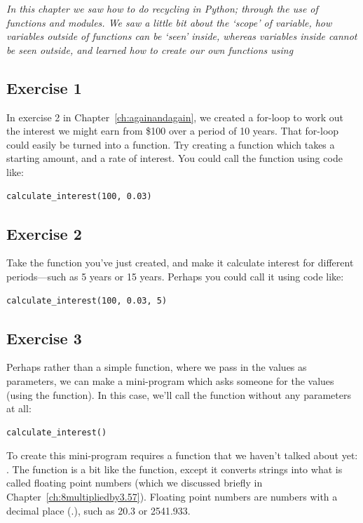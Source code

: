 \emph{In this chapter we saw how to do recycling in Python; through the use of functions and modules.  We saw a little bit about the `scope' of variable, how variables outside of functions can be `seen' inside, whereas variables inside cannot be seen outside, and learned how to create our own functions using }

\subsection*{Exercise 1}
In exercise 2 in Chapter~\ref{ch:againandagain}, we created a for-loop to work out the interest we might earn from \$100 over a period of 10 years.  That for-loop could easily be turned into a function.  Try creating a function which takes a starting amount, and a rate of interest.  You could call the function using code like:

\begin{listing}
\begin{verbatim}
calculate_interest(100, 0.03)
\end{verbatim}
\end{listing}

\subsection*{Exercise 2}
Take the function you've just created, and make it calculate interest for different periods---such as 5 years or 15 years.  Perhaps you could call it using code like:

\begin{listing}
\begin{verbatim}
calculate_interest(100, 0.03, 5)
\end{verbatim}
\end{listing}

\subsection*{Exercise 3}
Perhaps rather than a simple function, where we pass in the values as parameters, we can make a mini-program which asks someone for the values (using the  function).  In this case, we'll call the function without any parameters at all:

\begin{listing}
\begin{verbatim}
calculate_interest()
\end{verbatim}
\end{listing}

\noindent
To create this mini-program requires a function that we haven't talked about yet: . The  function is a bit like the  function, except it converts strings into what is called floating point numbers (which we discussed briefly in Chapter~\ref{ch:8multipliedby3.57}).  Floating point numbers are numbers with a decimal place (.), such as 20.3 or 2541.933.

\newpage
